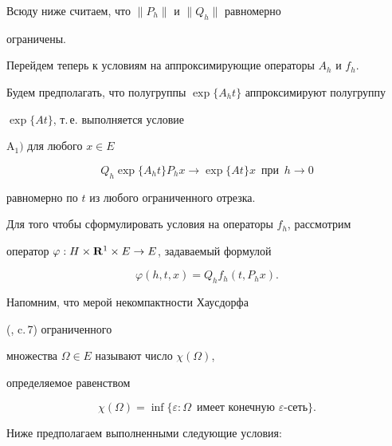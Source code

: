Всюду ниже считаем, что $\| P_h \|$ и $\| Q_h \|$ равномерно 


ограничены.





Перейдем теперь к условиям на аппроксимирующие операторы $A_h$ и $f_h$.


Будем предполагать, что полугруппы $\exp\{A_h t\}$ аппроксимируют полугруппу


$\exp\{At\}$, т.\,е. выполняется условие


{\it





$\mathrm A_1)$ для любого $x\in E$


$$


Q_h \exp\{A_h t\} P_h x \longrightarrow \exp\{At\}x


\ \; \text{при}\ \; h\to 0


$$ 


равномерно по $t$ из любого ограниченного отрезка.


}





Для того чтобы сформулировать условия на операторы $f_h$, рассмотрим 


оператор $\varphi : H\times \bold R^1\times E \to E$, задаваемый формулой 


$$


\varphi(h,t,x)= Q_h f_h (t,P_h x).


$$





Напомним, что мерой некомпактности Хаусдорфа 


(\cite{5}, c.\,7) ограниченного


множества $\Omega\in E$ называют число $\chi (\Omega )$,


определяемое равенством


$$


\chi (\Omega)= \inf \{\varepsilon :


\Omega\ \; \text{имеет конечную $\varepsilon$-сеть}\}.


$$ 





Ниже предполагаем выполненными следующие условия:


